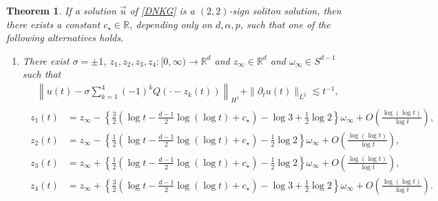 \documentclass[10pt,a4paper]{amsart}
\newtheorem{theorem}{Theorem}[section]
\numberwithin{equation}{section}
\begin{document}
\begin{theorem}\label{maintheorem}
If a solution $\vec{u}$ of \eqref{DNKG} is a $(2,2)$-sign soliton solution, then there exists a constant $c_{\star}\in \mathbb{R}$, depending only on $d,\alpha,p$, such that one of the following alternatives holds.
\begin{enumerate}
\item There exist $\sigma=\pm 1$, $z_1,z_2,z_3,z_4:[0,\infty)\to\mathbb{R}^d$ and $z_{\infty}\in\mathbb{R}^d$ and  $\omega_{\infty}\in S^{d-1}$ such that 
\begin{align}\label{4linetheorem1}
\left\| u(t)-\sigma \sum_{k=1}^4 (-1)^kQ(\cdot-z_k(t))\right\|_{H^1}+\|{\partial}_tu(t)\|_{L^2}\lesssim t^{-1},
\end{align}
\begin{align}\label{4linetheorem2}
\begin{aligned}
z_1(t)&=z_{\infty}-\left\{\frac{3}{2}\left(\log{t}-\frac{d-1}{2}\log{(\log{t})}+c_{\star}\right)-\log{3}+\frac{1}{2}\log{2} \right\}\omega_{\infty}+O\left(\frac{\log{(\log{t})}}{\log{t}}\right),
\\
z_2(t)&=z_{\infty}-\left\{\frac{1}{2}\left(\log{t}-\frac{d-1}{2}\log{(\log{t})}+c_{\star}\right)-\frac{1}{2}\log{2} \right\}\omega_{\infty}+O\left(\frac{\log{(\log{t})}}{\log{t}}\right),
\\
z_3(t)&=z_{\infty}+\left\{\frac{1}{2}\left(\log{t}-\frac{d-1}{2}\log{(\log{t})}+c_{\star}\right)-\frac{1}{2}\log{2} \right\}\omega_{\infty}+O\left(\frac{\log{(\log{t})}}{\log{t}}\right),
\\
z_4(t)&=z_{\infty}+\left\{\frac{3}{2}\left(\log{t}-\frac{d-1}{2}\log{(\log{t})}+c_{\star}\right)-\log{3}+\frac{1}{2}\log{2} \right\}\omega_{\infty}+O\left(\frac{\log{(\log{t})}}{\log{t}}\right).
\end{aligned}
\end{align}



\end{enumerate}
\end{theorem}
\end{document}
